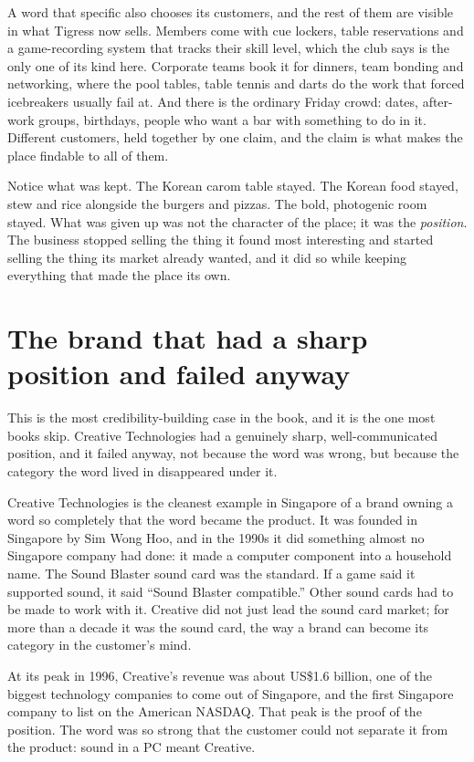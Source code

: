 \documentclass[10pt,twoside,openany]{memoir}
\newcommand{\needspacehead}{\needspace{4\baselineskip}}
\let\oldsection\section
\renewcommand{\section}{\needspacehead\oldsection}
\begin{document}
{A word that specific also chooses its customers, and the rest of them
are visible in what Tigress now sells. Members come with cue lockers,
table reservations and a game-recording system that tracks their skill
level, which the club says is the only one of its kind here. Corporate
teams book it for dinners, team bonding and networking, where the pool
tables, table tennis and darts do the work that forced icebreakers
usually fail at. And there is the ordinary Friday crowd: dates,
after-work groups, birthdays, people who want a bar with something to do
in it. Different customers, held together by one claim, and the claim is
what makes the place findable to all of them.

Notice what was kept. The Korean carom table stayed. The Korean food
stayed, stew and rice alongside the burgers and pizzas. The bold,
photogenic room stayed. What was given up was not the character of the
place; it was the \emph{position}. The business stopped selling the
thing it found most interesting and started selling the thing its market
already wanted, and it did so while keeping everything that made the
place its own.

\section{The brand that had a sharp position and failed
anyway}\label{the-brand-that-had-a-sharp-position-and-failed-anyway}

This is the most credibility-building case in the book, and it is the
one most books skip. Creative Technologies had a genuinely sharp,
well-communicated position, and it failed anyway, not because the word
was wrong, but because the category the word lived in disappeared under
it.

Creative Technologies is the cleanest example in Singapore of a brand
owning a word so completely that the word became the product. It was
founded in Singapore by Sim Wong Hoo, and in the 1990s it did something
almost no Singapore company had done: it made a computer component into
a household name. The Sound Blaster sound card was the standard. If a
game said it supported sound, it said ``Sound Blaster compatible.''
Other sound cards had to be made to work with it. Creative did not just
lead the sound card market; for more than a decade it was the sound
card, the way a brand can become its category in the customer's mind.

At its peak in 1996, Creative's revenue was about US\$1.6 billion, one
of the biggest technology companies to come out of Singapore, and the
first Singapore company to list on the American NASDAQ. That peak is the
proof of the position. The word was so strong that the customer could
not separate it from the product: sound in a PC meant Creative.

}
\end{document}
